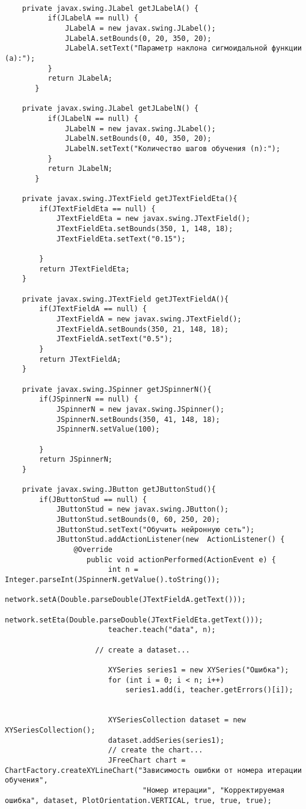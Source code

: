 \begin{verbatim}
	
	private javax.swing.JLabel getJLabelA() {
	      if(JLabelA == null) {
	    	  JLabelA = new javax.swing.JLabel();
	    	  JLabelA.setBounds(0, 20, 350, 20);
	    	  JLabelA.setText("Параметр наклона сигмоидальной функции (a):");
	      }
	      return JLabelA;
	   }
	
	private javax.swing.JLabel getJLabelN() {
	      if(JLabelN == null) {
	    	  JLabelN = new javax.swing.JLabel();
	    	  JLabelN.setBounds(0, 40, 350, 20);
	    	  JLabelN.setText("Количество шагов обучения (n):");
	      }
	      return JLabelN;
	   }
	
	private javax.swing.JTextField getJTextFieldEta(){
		if(JTextFieldEta == null) {
			JTextFieldEta = new javax.swing.JTextField();
			JTextFieldEta.setBounds(350, 1, 148, 18);
			JTextFieldEta.setText("0.15");
			
		}
		return JTextFieldEta;
	}
	
	private javax.swing.JTextField getJTextFieldA(){
		if(JTextFieldA == null) {
			JTextFieldA = new javax.swing.JTextField();
			JTextFieldA.setBounds(350, 21, 148, 18);
			JTextFieldA.setText("0.5");
		}
		return JTextFieldA;
	}
	
	private javax.swing.JSpinner getJSpinnerN(){
		if(JSpinnerN == null) {
			JSpinnerN = new javax.swing.JSpinner();
			JSpinnerN.setBounds(350, 41, 148, 18);	
			JSpinnerN.setValue(100);
			
		}
		return JSpinnerN;
	}
	
	private javax.swing.JButton getJButtonStud(){
		if(JButtonStud == null) {
			JButtonStud = new javax.swing.JButton();
			JButtonStud.setBounds(0, 60, 250, 20);	
			JButtonStud.setText("Обучить нейронную сеть");
			JButtonStud.addActionListener(new  ActionListener() {
				@Override
	               public void actionPerformed(ActionEvent e) {
						int n = Integer.parseInt(JSpinnerN.getValue().toString());
						network.setA(Double.parseDouble(JTextFieldA.getText()));
						network.setEta(Double.parseDouble(JTextFieldEta.getText()));
	                    teacher.teach("data", n);
	                    
	                 // create a dataset...
	                 
	                    XYSeries series1 = new XYSeries("Ошибка");
	                    for (int i = 0; i < n; i++)
	                    	series1.add(i, teacher.getErrors()[i]);
	                    
	                    
	                    XYSeriesCollection dataset = new XYSeriesCollection();
	                    dataset.addSeries(series1);
	                    // create the chart...
	                    JFreeChart chart = ChartFactory.createXYLineChart("Зависимость ошибки от номера итерации обучения", 
	                    		"Номер итерации", "Корректируемая ошибка", dataset, PlotOrientation.VERTICAL, true, true, true);
	     


\end{verbatim}
